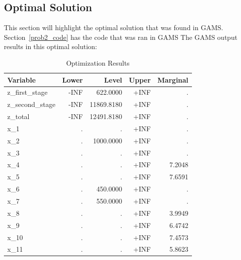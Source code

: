 \documentclass[11pt]{article}
\begin{document}
\subsection{Optimal Solution}
This section will highlight the optimal solution that was found in GAMS.
Section~\ref{prob2_code} has the code that was ran in GAMS
The GAMS output results in this optimal solution:

\begin{table}[htbp]
\centering
\caption{Optimization Results}
\label{tab:optimization_results}
\begin{tabular}{|l|r|r|r|r|}
\hline
\textbf{Variable} & \textbf{Lower} & \textbf{Level} & \textbf{Upper} & \textbf{Marginal} \\ \hline
z\_first\_stage   & -INF           & 622.0000       & +INF           & .                 \\ \hline
z\_second\_stage  & -INF           & 11869.8180     & +INF           & .                 \\ \hline
z\_total          & -INF           & 12491.8180     & +INF           & .                 \\ \hline
x\_1              & .              & .              & +INF           & .                 \\ \hline
x\_2              & .              & 1000.0000      & +INF           & .                 \\ \hline
x\_3              & .              & .              & +INF           & .                 \\ \hline
x\_4              & .              & .              & +INF           & 7.2048            \\ \hline
x\_5              & .              & .              & +INF           & 7.6591            \\ \hline
x\_6              & .              & 450.0000       & +INF           & .                 \\ \hline
x\_7              & .              & 550.0000       & +INF           & .                 \\ \hline
x\_8              & .              & .              & +INF           & 3.9949            \\ \hline
x\_9              & .              & .              & +INF           & 6.4742            \\ \hline
x\_10             & .              & .              & +INF           & 7.4573            \\ \hline
x\_11             & .              & .              & +INF           & 5.8623            \\ \hline

\end{tabular}
\end{table}
\end{document}
